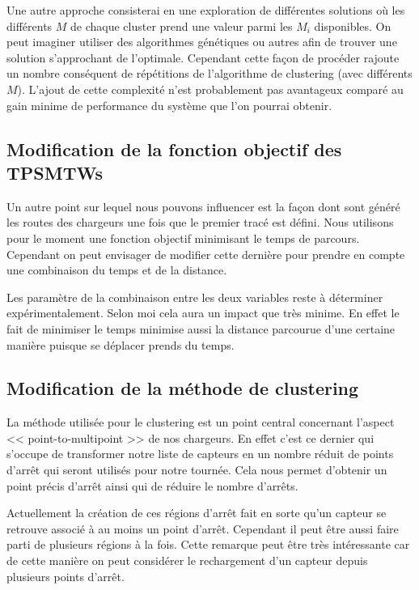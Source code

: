 \documentclass[final]{polytech/polytech}
\begin{document}
			Une autre approche consisterai en une exploration de différentes solutions où les différents $M$ de chaque cluster prend une valeur parmi les $M_i$ disponibles.
			On peut imaginer utiliser des algorithmes génétiques ou autres afin de trouver une solution s'approchant de l'optimale.
			Cependant cette façon de procéder rajoute un nombre conséquent de répétitions de l'algorithme de clustering (avec différents $M$).
			L'ajout de cette complexité n'est probablement pas avantageux comparé au gain minime de performance du système que l'on pourrai obtenir.
						
		\subsection{Modification de la fonction objectif des TPSMTWs}
			Un autre point sur lequel nous pouvons influencer est la façon dont sont généré les routes des chargeurs une fois que le premier tracé est défini.
			Nous utilisons pour le moment une fonction objectif minimisant le temps de parcours.
			Cependant on peut envisager de modifier cette dernière pour prendre en compte une combinaison du temps et de la distance.
			
			Les paramètre de la combinaison entre les deux variables reste à déterminer expérimentalement.
			Selon moi cela aura un impact que très minime.
			En effet le fait de minimiser le temps minimise aussi la distance parcourue d'une certaine manière puisque se déplacer prends du temps.
		
		\subsection{Modification de la méthode de clustering}
			La méthode utilisée pour le clustering est un point central concernant l'aspect << point-to-multipoint >> de nos chargeurs.
			En effet c'est ce dernier qui s'occupe de transformer notre liste de capteurs en un nombre réduit de points d'arrêt qui seront utilisés pour notre tournée.
			Cela nous permet d'obtenir un point précis d'arrêt ainsi qui de réduire le nombre d'arrêts.
			
			Actuellement la création de ces régions d'arrêt fait en sorte qu'un capteur se retrouve associé à au moins un point d'arrêt.
			Cependant il peut être aussi faire parti de plusieurs régions à la fois. 
			Cette remarque peut être très intéressante car de cette manière on peut considérer le rechargement d'un capteur depuis plusieurs points d'arrêt.
			
\end{document}
